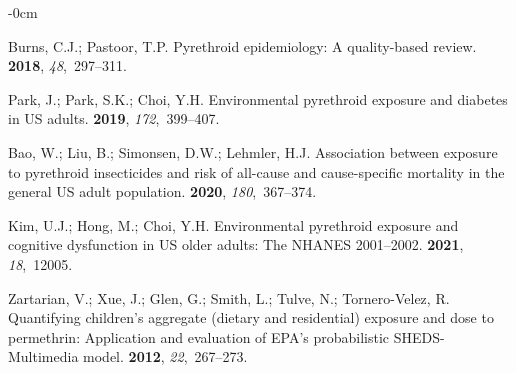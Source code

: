 \documentclass[toxics,article,accept,pdftex,moreauthors]{Definitions/mdpi}
\begin{document}
\newpage
\begin{adjustwidth}{-\extralength}{0cm}



%

\begin{thebibliography}{999}

Burns, C.J.; Pastoor, T.P.
\newblock Pyrethroid epidemiology: A quality-based review.
 {\bf 2018}, {\em 48},~297--311.

Park, J.; Park, S.K.; Choi, Y.H.
\newblock Environmental pyrethroid exposure and diabetes in US adults.
 {\bf 2019}, {\em 172},~399--407.

Bao, W.; Liu, B.; Simonsen, D.W.; Lehmler, H.J.
\newblock Association between exposure to pyrethroid insecticides and risk of
  all-cause and cause-specific mortality in the general US adult population.
 {\bf 2020}, {\em 180},~367--374.

Kim, U.J.; Hong, M.; Choi, Y.H.
\newblock Environmental pyrethroid exposure and cognitive dysfunction in US
  older adults: The NHANES 2001--2002.
 {\bf 2021}, {\em 18},~12005.

Zartarian, V.; Xue, J.; Glen, G.; Smith, L.; Tulve, N.; Tornero-Velez, R.
\newblock Quantifying children's aggregate (dietary and residential) exposure
  and dose to permethrin: Application and evaluation of EPA's probabilistic
  SHEDS-Multimedia model.
 {\bf
  2012}, {\em 22},~267--273.


\end{thebibliography}
\end{adjustwidth}
\end{document}
